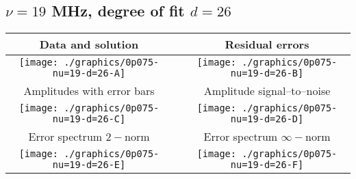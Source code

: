 

% 

\clearpage{}
\break{}

\subsection{$\nu = 19$ MHz, degree of fit $d = 26$}

\begin{table}[h]
    \begin{center}
        \begin{tabular}{ccc}
            Data and solution & \quad & Residual errors \\\hline
            \texttt{[image: ./graphics/0p075-nu=19-d=26-A]} &&
            \texttt{[image: ./graphics/0p075-nu=19-d=26-B]} \\[15pt]
            Amplitudes with error bars && Amplitude signal--to--noise \\\hline
            \texttt{[image: ./graphics/0p075-nu=19-d=26-C]} &&
            \texttt{[image: ./graphics/0p075-nu=19-d=26-D]} \\[15pt]
            Error spectrum $2-$norm && Error spectrum $\infty-$norm \\\hline
            \texttt{[image: ./graphics/0p075-nu=19-d=26-E]} &&
            \texttt{[image: ./graphics/0p075-nu=19-d=26-F]} \\[15pt]
        \end{tabular}
    \end{center}
\label{fig:elev=75, nu=19}
\end{table}



\endinput
